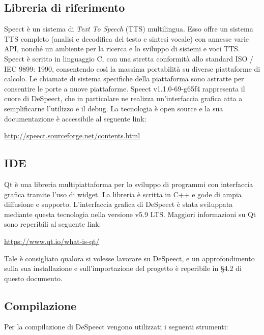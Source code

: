 \documentclass[openany,12pt,a4paper]{report}
\begin{document}
	\subsection{Libreria di riferimento}
	Speect è un sistema di \textit{Text To Speech} (TTS) multilingua. Esso offre un sistema TTS completo (analisi e decodifica del testo e sintesi vocale) con annesse varie API, nonché un ambiente per la ricerca e lo sviluppo di sistemi e voci TTS. Speect è scritto in linguaggio C, con una stretta conformità allo standard ISO / IEC 9899: 1990, consentendo così la massima portabilità su diverse piattaforme di calcolo. Le chiamate di sistema specifiche della piattaforma sono astratte per consentire le porte a nuove piattaforme. Speect v1.1.0-69-g65f4 rappresenta il cuore di DeSpeect, che in particolare ne realizza un'interfaccia grafica atta a semplificarne l'utilizzo e il debug. La tecnologia è open source e la sua documentazione è accessibile al seguente link:
	\begin{center}
	\url{http://speect.sourceforge.net/contents.html}
	\end{center}
	
	\subsection{IDE}
	
	Qt è una libreria multipiattaforma per lo sviluppo di programmi con interfaccia grafica tramite l'uso di widget. La libreria è scritta in C++ e gode di ampia diffusione e supporto. L'interfaccia grafica di DeSpeect è stata sviluppata mediante questa tecnologia nella versione v5.9 LTS. Maggiori informazioni su Qt sono reperibili al seguente link:
	\begin{center}
	\centerline{\url{https://www.qt.io/what-is-qt/}}
	\end{center}
	Tale  è consigliato qualora si volesse lavorare su DeSpeect, e un approfondimento sulla sua installazione e sull'importazione del progetto è reperibile in §4.2 di questo documento. 
	
	\subsection{Compilazione}
	
	Per la compilazione di DeSpeect vengono utilizzati i seguenti strumenti:
	
\end{document}
